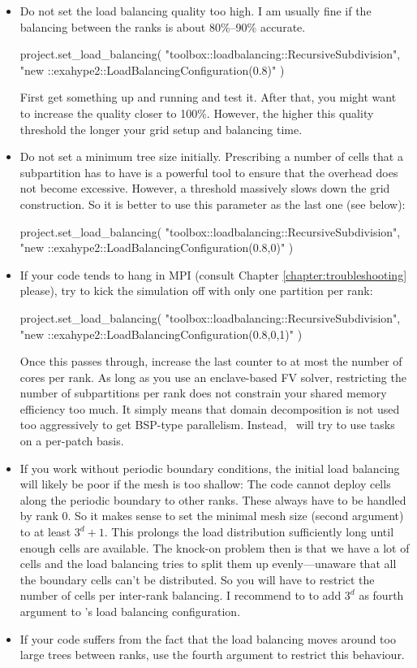 \begin{itemize}
  \item Do not set the load balancing quality too high. I am usually fine if the
  balancing between the ranks is about 80\%--90\% accurate. 
\begin{code}
project.set_load_balancing(
 "toolbox::loadbalancing::RecursiveSubdivision", 
 "new ::exahype2::LoadBalancingConfiguration(0.8)" )
\end{code}
  First get something up and running and test it. After that, you might want to
  increase the quality closer to 100\%. However, the higher this quality
  threshold the longer your grid setup and balancing time.
  \item Do not set a minimum
  tree size initially.
  Prescribing a number of cells that a subpartition has to have is a powerful tool to ensure that the overhead
  does not become excessive. However, a threshold massively slows down the grid
  construction. So it is better to use this parameter as the last one (see
  below):
\begin{code}
project.set_load_balancing(
 "toolbox::loadbalancing::RecursiveSubdivision", 
 "new ::exahype2::LoadBalancingConfiguration(0.8,0)" )
\end{code}
  \item If your code tends to hang in MPI (consult Chapter
  \ref{chapter:troubleshooting} please), try to kick the simulation off with
  only one partition per rank:
\begin{code}
project.set_load_balancing(
 "toolbox::loadbalancing::RecursiveSubdivision", 
 "new ::exahype2::LoadBalancingConfiguration(0.8,0,1)" )
\end{code}
  Once this passes through, increase the last counter to at most the number of
  cores per rank. As long as you use an enclave-based FV solver, restricting the
  number of subpartitions per rank does not constrain your shared memory
  efficiency too much. It simply means that domain decomposition is not used too
  aggressively to get BSP-type parallelism. Instead, \Peano\ will try to use
  tasks on a per-patch basis.
  \item If you work without periodic boundary conditions, the initial load
  balancing will likely be poor if the mesh is too shallow: The code cannot
  deploy cells along the periodic boundary to other ranks. These always have to
  be handled by rank 0. So it makes sense to set the minimal mesh size (second
  argument) to at least $3^d+1$. This prolongs the load distribution
  sufficiently long until enough cells are available. The knock-on problem then
  is that we have a lot of cells and the load balancing tries to split them up
  evenly---unaware that all the boundary cells can't be distributed. So you will
  have to restrict the number of cells per inter-rank balancing. I recommend to
  to add $3^d$ as fourth argument to \ExaHyPE's load balancing configuration.
  \item If your code suffers from the fact that the load balancing moves around
  too large trees between ranks, use the fourth argument to restrict this
  behaviour.
\end{itemize}


